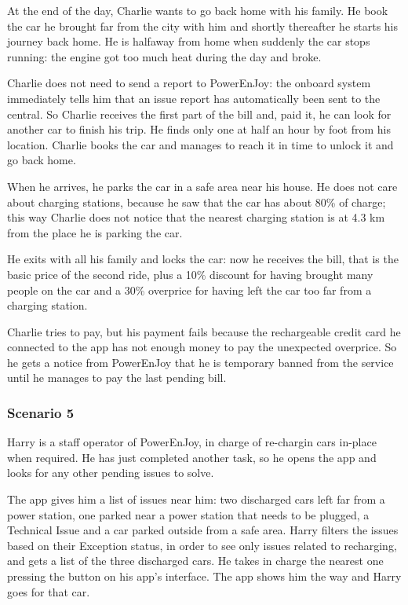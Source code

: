 \documentclass[11pt]{article} %
\newcommand{\pe}{PowerEnJoy }
\newcommand{\pecomma}{PowerEnJoy, }
\begin{document}
At the end of the day, Charlie wants to go back home with his family. He book the car he brought far from the city with him and shortly thereafter he starts his journey back home. He is halfaway from home when suddenly the car stops running: the engine got too much heat during the day and broke.

Charlie does not need to send a report to PowerEnJoy: the onboard system immediately tells him that an issue report has automatically been sent to the central. So Charlie receives the first part of the bill and, paid it, he can look for another car to finish his trip. He finds only one at half an hour by foot from his location. Charlie books the car and manages to reach it in time to unlock it and go back home.

When he arrives, he parks the car in a safe area near his house. He does not care about charging stations, because he saw that the car has about 80\% of charge; this way Charlie does not notice that the nearest charging station is at 4.3 km from the place he is parking the car.

He exits with all his family and locks the car: now he receives the bill, that is the basic price of the second ride, plus a 10\% discount for having brought many people on the car and a 30\% overprice for having left the car too far from a charging station.

Charlie tries to pay, but his payment fails because the rechargeable credit card he connected to the app has not enough money to pay the unexpected overprice. So he gets a notice from \pe that he is temporary banned from the service until he manages to pay the last pending bill.

\subsubsection{Scenario 5}
Harry is a staff operator of \pecomma in charge of re-chargin cars in-place when required. He has just completed another task, so he opens the app and looks for any other pending issues to solve.

The app gives him a list of issues near him: two discharged cars left far from a power station, one parked near a power station that needs to be plugged, a Technical Issue and a car parked outside from a safe area. Harry filters the issues based on their Exception status, in order to see only issues related to recharging, and gets a list of the three discharged cars. He takes in charge the nearest one pressing the button on his app's interface. The app shows him the way and Harry goes for that car.
\end{document}
